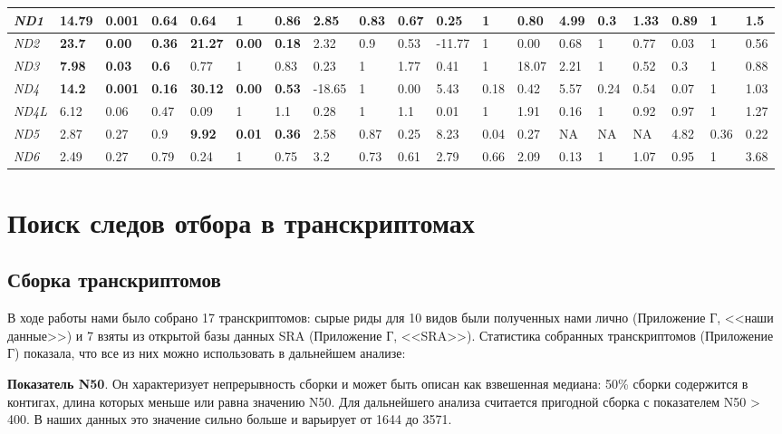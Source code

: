 \begin{landscape}
\begin{table}[]
\begin{tabular}{|l|l|l|l|l|l|l|l|l|l|l|l|l|l|l|l|l|l|l|}
		\textit{ND1} & \textbf{14.79} & \textbf{0.001} & \textbf{0.64} & 0.64 & 1 & 0.86 & 2.85 & 0.83 & 0.67 & 0.25 & 1 & 0.80 & 4.99 & 0.3 & 1.33 & 0.89 & 1 & 1.5 \\ \hline
		\textit{ND2} & \textbf{23.7} & \textbf{0.00} & \textbf{0.36} & \textbf{21.27} & \textbf{0.00} & \textbf{0.18} & 2.32 & 0.9 & 0.53 & -11.77 & 1 & 0.00 & 0.68 & 1 & 0.77 & 0.03 & 1 & 0.56 \\ \hline
		\textit{ND3} & \textbf{7.98} & \textbf{0.03} & \textbf{0.6} & 0.77 & 1 & 0.83 & 0.23 & 1 & 1.77 & 0.41 & 1 & 18.07 & 2.21 & 1 & 0.52 & 0.3 & 1 & 0.88 \\ \hline
		\textit{ND4} & \textbf{14.2} & \textbf{0.001} & \textbf{0.16} & \textbf{30.12} & \textbf{0.00} & \textbf{0.53} & -18.65 & 1 & 0.00 & 5.43 & 0.18 & 0.42 & 5.57 & 0.24 & 0.54 & 0.07 & 1 & 1.03 \\ \hline
		\textit{ND4L} & 6.12 & 0.06 & 0.47 & 0.09 & 1 & 1.1 & 0.28 & 1 & 1.1 & 0.01 & 1 & 1.91 & 0.16 & 1 & 0.92 & 0.97 & 1 & 1.27 \\ \hline
		\textit{ND5} & 2.87 & 0.27 & 0.9 & \textbf{9.92} & \textbf{0.01} & \textbf{0.36} & 2.58 & 0.87 & 0.25 & 8.23 & 0.04 & 0.27 & NA & NA & NA & 4.82 & 0.36 & 0.22 \\ \hline
		\textit{ND6} & 2.49 & 0.27 & 0.79 & 0.24 & 1 & 0.75 & 3.2 & 0.73 & 0.61 & 2.79 & 0.66 & 2.09 & 0.13 & 1 & 1.07 & 0.95 & 1 & 3.68 \\ \hline
	\end{tabular}
\end{table}

\end{landscape}

\section{Поиск следов отбора в транскриптомах}

\subsection{Сборка транскриптомов}

В ходе работы нами было собрано 17 транскриптомов: сырые риды для 10 видов были полученных нами лично (Приложение Г, <<наши данные>>) и 7 взяты из открытой базы данных SRA (Приложение Г, <<SRA>>). Статистика собранных транскриптомов (Приложение Г) показала, что все из них можно использовать в дальнейшем анализе:

\textbf{Показатель N50}. Он характеризует непрерывность сборки и может быть описан как взвешенная медиана: 50\% сборки содержится в контигах, длина которых меньше или равна значению N50. Для дальнейшего анализа считается пригодной сборка с показателем N50 > 400. В наших данных это значение сильно больше и варьирует от 1644 до 3571. 
	

